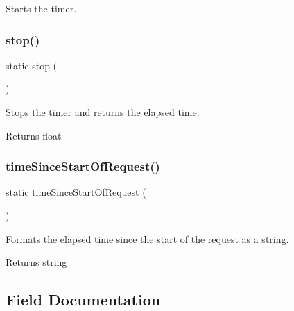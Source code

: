 Starts the timer. \mbox{\label{class_p_h_p___timer_a00c3c0c2fc53579e9d1ac28a52623450}} 
\subsubsection{\texorpdfstring{stop()}{stop()}}
{\footnotesize\ttfamily static stop (\begin{DoxyParamCaption}{ }\end{DoxyParamCaption})\hspace{0.3cm}{\ttfamily [static]}}

Stops the timer and returns the elapsed time.

\begin{DoxyReturn}{Returns}
float 
\end{DoxyReturn}
\mbox{\label{class_p_h_p___timer_a47261cd60577fea5503d5994e45b6811}} 
\subsubsection{\texorpdfstring{time\+Since\+Start\+Of\+Request()}{timeSinceStartOfRequest()}}
{\footnotesize\ttfamily static time\+Since\+Start\+Of\+Request (\begin{DoxyParamCaption}{ }\end{DoxyParamCaption})\hspace{0.3cm}{\ttfamily [static]}}

Formats the elapsed time since the start of the request as a string.

\begin{DoxyReturn}{Returns}
string 
\end{DoxyReturn}


\subsection{Field Documentation}
\mbox{\label{class_p_h_p___timer_a9d3accc7e7c5a7f4c3157df35cde6cfa}} 
